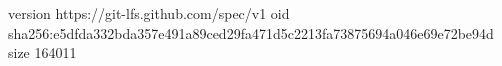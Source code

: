 version https://git-lfs.github.com/spec/v1
oid sha256:e5dfda332bda357e491a89ced29fa471d5c2213fa73875694a046e69e72be94d
size 164011
